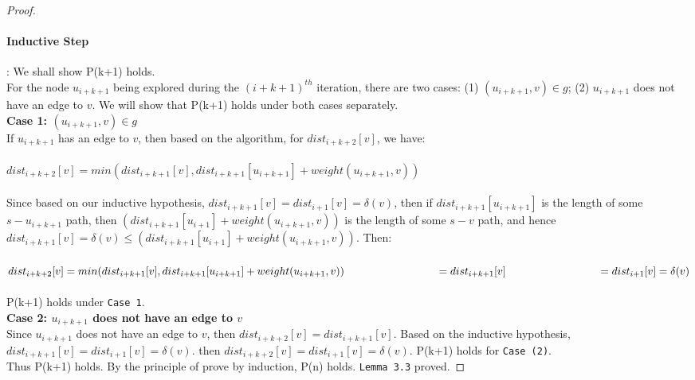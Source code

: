 \begin{proof}
\paragraph*{Inductive Step}: We shall show P(k+1) holds. 
\\
For the node $u_{i+k+1}$ being explored during the $(i+k+1)^{th}$ iteration, there are two cases: (1) $(u_{i+k+1}, v) \in g$; (2) $u_{i+k+1}$ does not have an edge to $v$. We will show that P(k+1) holds under both cases separately. 
\\
\textbf{Case 1: $(u_{i+k+1}, v) \in g$}
\\
If $u_{i+k+1}$ has an edge to $v$, then based on the algorithm, for $dist_{i+k+2}[v]$, we have: 
\\\\
  \tab $dist_{i+k+2}[v] = min(dist_{i+k+1}[v], dist_{i+k+1}[u_{i+k+1}] + weight(u_{i+k+1}, v))$
\\\\
Since based on our inductive hypothesis, $dist_{i+k+1}[v] = dist_{i+1}[v] = \delta(v)$, then if $dist_{i+k+1}[u_{i+k+1}] $ is the length of some $s-u_{i+k+1}$ path, then $(dist_{i+k+1}[u_{i+1}] + weight(u_{i+k+1}, v))$ is the length of some $s-v$ path, and hence $dist_{i+k+1}[v] = \delta(v) \leq (dist_{i+k+1}[u_{i+1}] + weight(u_{i+k+1}, v))$. Then: 
\\\\
 \tab $dist_{i+k+2}[v] = min(dist_{i+k+1}[v], dist_{i+k+1}[u_{i+k+1}] + weight(u_{i+k+1}, v)) \\
 \tab\tab\tab = dist_{i+k+1}[v]\\
 \tab\tab\tab = dist_{i+1}[v] = \delta(v)$
\\\\
P(k+1) holds under \texttt{Case 1}. 
\\
\textbf{Case 2: $u_{i+k+1}$ does not have an edge to $v$}
\\
Since $u_{i+k+1}$ does not have an edge to $v$, then $dist_{i+k+2}[v] = dist_{i+k+1}[v]$. Based on the inductive hypothesis, $dist_{i+k+1}[v] = dist_{i+1}[v] = \delta(v)$. then $dist_{i+k+2}[v] = dist_{i+1}[v] = \delta(v)$. P(k+1) holds for \texttt{Case (2)}. 
\\
Thus P(k+1) holds. By the principle of prove by induction, P(n) holds. \texttt{Lemma 3.3} proved. 

\end{proof}
